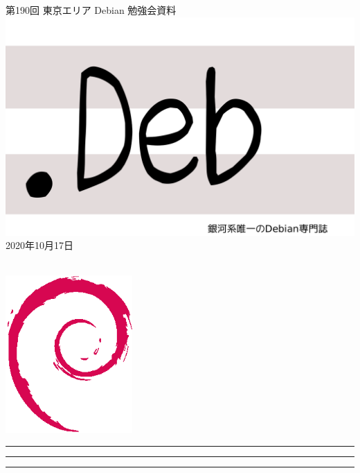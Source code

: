 \documentclass[mingoth,a4paper]{jsarticle}
\newcommand{\debmtgyear}{2020}
\newcommand{\debmtgmonth}{10}
\newcommand{\debmtgdate}{17}
\newcommand{\debmtgnumber}{190}
\begin{document}
\begin{titlepage}
\thispagestyle{empty}

\vspace*{-2cm}
第\debmtgnumber{}回 東京エリア Debian 勉強会資料\\
\hspace*{-2cm}
\includegraphics{image2012-natsu/dotdeb.pdf}\\
\hfill{}\debmtgyear{}年\debmtgmonth{}月\debmtgdate{}日

\\

\vspace*{-2cm}
\hfill{}\includegraphics[height=6cm]{image200502/openlogo-nd.eps}
\end{titlepage}

\newpage

\begin{minipage}[b]{0.2\hsize}
 \colorbox{titleback}{}
\end{minipage}
\begin{minipage}[b]{0.8\hsize}
\hrule
\vspace{2mm}
\hrule
\begin{multicols}{2}
\tableofcontents
\end{multicols}
\vspace{2mm}
\hrule
\end{minipage}
\end{document}
